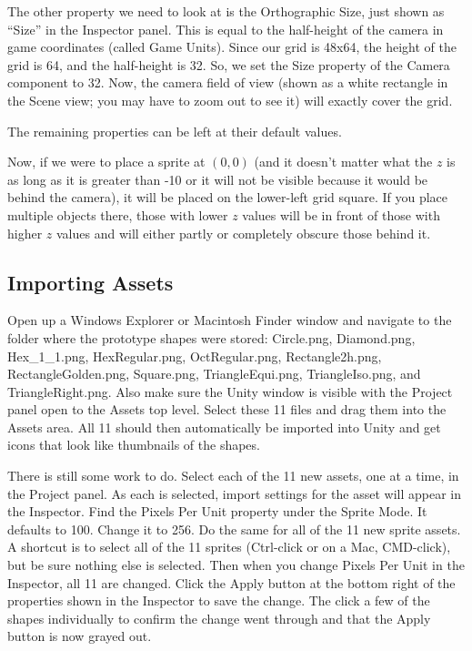\documentclass[12pt]{amsbook}
\theoremstyle{definition}
\theoremstyle{remark}
\numberwithin{figure}{chapter}
\numberwithin{table}{chapter}
\numberwithin{section}{chapter}
\numberwithin{equation}{section}
\begin{document}
The other property we need to look at is the Orthographic Size, just shown as ``Size'' in the Inspector panel.  This is equal to the half-height of the camera in game coordinates (called Game Units).  Since our grid is 48x64, the height of the grid is 64, and the half-height is 32.  So, we set the Size property of the Camera component to 32.  Now, the camera field of view (shown as a white rectangle in the Scene view; you may have to zoom out to see it) will exactly cover the grid.

The remaining properties can be left at their default values.

Now, if we were to place a sprite at $(0,0)$ (and it doesn't matter what the $z$ is as long as it is greater than -10 or it will not be visible because it would be behind the camera), it will be placed on the lower-left grid square.  If you place multiple objects there, those with lower $z$ values will be in front of those with higher $z$ values and will either partly or completely obscure those behind it.

\subsection{Importing Assets}
Open up a Windows Explorer or Macintosh Finder window and navigate to the folder where the prototype shapes were stored: Circle.png, Diamond.png, Hex\_1\_1.png, HexRegular.png, OctRegular.png, Rectangle2h.png, RectangleGolden.png, Square.png, TriangleEqui.png, TriangleIso.png, and TriangleRight.png.  Also make sure the Unity window is visible with the Project panel open to the Assets top level.  Select these 11 files and drag them into the Assets area.  All 11 should then automatically be imported into Unity and get icons that look like thumbnails of the shapes.

There is still some work to do.  Select each of the 11 new assets, one at a time, in the Project panel.  As each is selected, import settings for the asset will appear in the Inspector.  Find the Pixels Per Unit property under the Sprite Mode.  It defaults to 100.  Change it to 256.  Do the same for all of the 11 new sprite assets.  A shortcut is to select all of the 11 sprites (Ctrl-click or on a Mac, CMD-click), but be sure nothing else is selected.  Then when you change Pixels Per Unit in the Inspector, all 11 are changed.  Click the Apply button at the bottom right of the properties shown in the Inspector to save the change.  The click a few of the shapes individually to confirm the change went through and that the Apply button is now grayed out.
\end{document}
